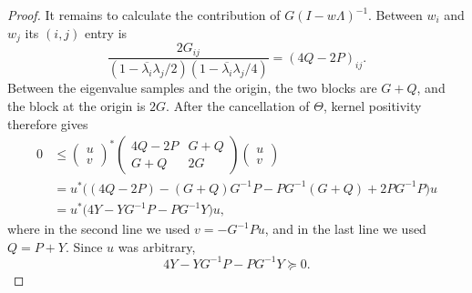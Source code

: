 \documentclass[preprints,article,submit,oneauthor]{Definitions/mdpi}
\theoremstyle{mdpi}
\theoremstyle{definition}
\begin{document}
\begin{proof}
It remains to calculate the contribution of
$G(I-w\Lambda)^{-1}$.  Between $w_i$ and $w_j$ its $(i,j)$ entry is
\begin{equation}
  \frac{2G_{ij}}
  {(1-\overline{\lambda_i}\lambda_j/2)
   (1-\overline{\lambda_i}\lambda_j/4)}
  =(4Q-2P)_{ij}.
  \label{eq:sampled-main-block}
\end{equation}
Between the eigenvalue samples and the origin, the two blocks are
$G+Q$, and the block at the origin is $2G$.  After the cancellation of
$\Theta$, kernel positivity therefore gives
\begin{equation}
\begin{aligned}
0&\leq
\begin{pmatrix}u\\v\end{pmatrix}^{\!*}
\begin{pmatrix}
  4Q-2P&G+Q\\
  G+Q&2G
\end{pmatrix}
\begin{pmatrix}u\\v\end{pmatrix}\\
&=u^*\bigl((4Q-2P)-(G+Q)G^{-1}P
-PG^{-1}(G+Q)+2PG^{-1}P\bigr)u\\
&=u^*\bigl(4Y-YG^{-1}P-PG^{-1}Y\bigr)u,
\end{aligned}
\label{eq:pre-gramian-inequality}
\end{equation}
where in the second line we used $v=-G^{-1}Pu$, and in the last line
we used $Q=P+Y$.
Since $u$ was arbitrary,
\begin{equation}
  4Y-YG^{-1}P-PG^{-1}Y\succeq0.
  \label{eq:Y-inequality}
\end{equation}


\end{proof}
\end{document}
